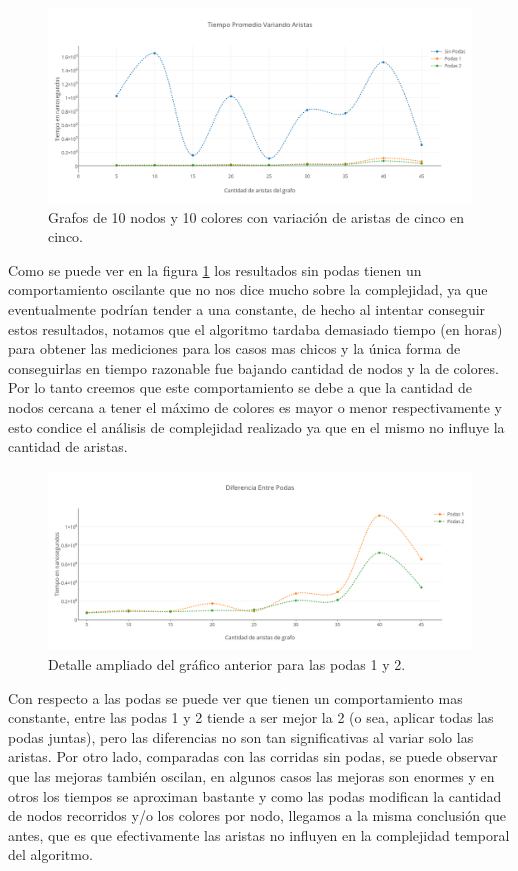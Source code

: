 \begin{figure}[H]
	\centering
 	\includegraphics[scale=0.45]{imagenes/ej2/Aristas.png}
	\caption{Grafos de 10 nodos y 10 colores con variación de aristas de cinco en cinco.}
	\label{aristas}
 \end{figure}

 Como se puede ver en la figura \ref{aristas} los resultados sin podas tienen un comportamiento oscilante que no nos dice mucho sobre la complejidad, ya que eventualmente podrían tender a una constante, de hecho al intentar conseguir estos resultados, notamos que el algoritmo tardaba demasiado tiempo (en horas) para obtener las mediciones para los casos mas chicos y la única forma de conseguirlas en tiempo razonable fue bajando cantidad de nodos y la de colores. Por lo tanto creemos que este comportamiento se debe a que la cantidad de nodos cercana a tener el máximo de colores es mayor o menor respectivamente y esto condice el análisis de complejidad realizado ya que en el mismo no influye la cantidad de aristas.

\begin{figure}[H]
	\centering
 	\includegraphics[scale=0.45]{imagenes/ej2/AristasPodas.png}
	\caption{Detalle ampliado del gráfico anterior para las podas 1 y 2.}
	\label{aristasP}
 \end{figure}

 Con respecto a las podas se puede ver que tienen un comportamiento mas constante, entre las podas 1 y 2 tiende a ser mejor la 2 (o sea, aplicar todas las podas juntas), pero las diferencias no son tan significativas al variar solo las aristas. Por otro lado, comparadas con las corridas sin podas, se puede observar que las mejoras también oscilan, en algunos casos las mejoras son enormes y en otros los tiempos se aproximan bastante y como las podas modifican la cantidad de nodos recorridos y/o los colores por nodo, llegamos a la misma conclusión que antes, que es que efectivamente las aristas no influyen en la complejidad temporal del algoritmo.\\

